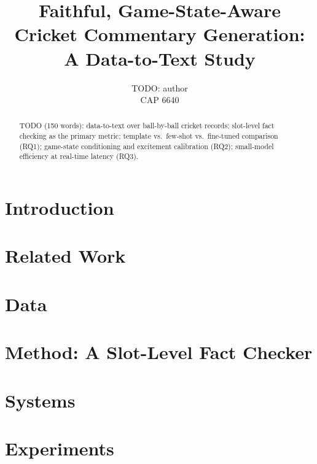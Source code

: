 \documentclass[11pt,twocolumn]{article}
\title{Faithful, Game-State-Aware Cricket Commentary Generation:\\
       A Data-to-Text Study}
\author{TODO: author \\ CAP 6640}
\date{}
\begin{document}
\maketitle

\begin{abstract}
TODO (150 words): data-to-text over ball-by-ball cricket records; slot-level
fact checking as the primary metric; template vs.\ few-shot vs.\ fine-tuned
comparison (RQ1); game-state conditioning and excitement calibration (RQ2);
small-model efficiency at real-time latency (RQ3).
\end{abstract}

\section{Introduction}

\section{Related Work}

\section{Data}

\section{Method: A Slot-Level Fact Checker}

\section{Systems}

\section{Experiments}
\end{document}
